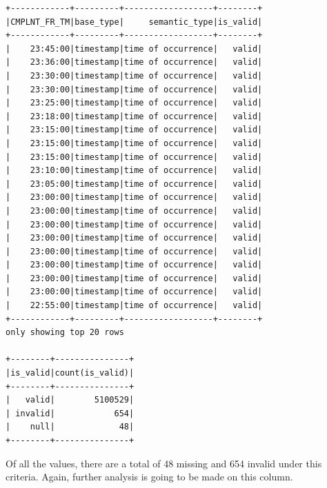 \documentclass{article}
\begin{document}
\begin{itemize}
\begin{verbatim}
+------------+---------+------------------+--------+
|CMPLNT_FR_TM|base_type|     semantic_type|is_valid|
+------------+---------+------------------+--------+
|    23:45:00|timestamp|time of occurrence|   valid|
|    23:36:00|timestamp|time of occurrence|   valid|
|    23:30:00|timestamp|time of occurrence|   valid|
|    23:30:00|timestamp|time of occurrence|   valid|
|    23:25:00|timestamp|time of occurrence|   valid|
|    23:18:00|timestamp|time of occurrence|   valid|
|    23:15:00|timestamp|time of occurrence|   valid|
|    23:15:00|timestamp|time of occurrence|   valid|
|    23:15:00|timestamp|time of occurrence|   valid|
|    23:10:00|timestamp|time of occurrence|   valid|
|    23:05:00|timestamp|time of occurrence|   valid|
|    23:00:00|timestamp|time of occurrence|   valid|
|    23:00:00|timestamp|time of occurrence|   valid|
|    23:00:00|timestamp|time of occurrence|   valid|
|    23:00:00|timestamp|time of occurrence|   valid|
|    23:00:00|timestamp|time of occurrence|   valid|
|    23:00:00|timestamp|time of occurrence|   valid|
|    23:00:00|timestamp|time of occurrence|   valid|
|    23:00:00|timestamp|time of occurrence|   valid|
|    22:55:00|timestamp|time of occurrence|   valid|
+------------+---------+------------------+--------+
only showing top 20 rows

+--------+---------------+      
|is_valid|count(is_valid)|
+--------+---------------+
|   valid|        5100529|
| invalid|            654|
|    null|             48|
+--------+---------------+
\end{verbatim}

Of all the values, there are a total of 48 missing and 654 invalid under this criteria. Again, further analysis is going to be made on this column. 


\end{itemize}
\end{document}
